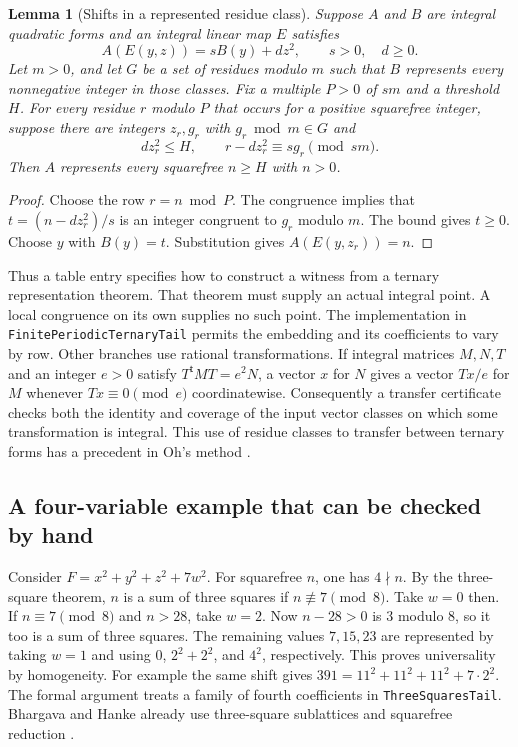 \documentclass[11pt,a4paper]{article}
\newtheorem{lemma}[theorem]{Lemma}
\newcommand{\code}[1]{\texttt{#1}}
\begin{document}
\begin{lemma}[Shifts in a represented residue class]\label{lem:shift}
Suppose $A$ and $B$ are integral quadratic forms and an integral linear
map $E$ satisfies
\[
 A(E(y,z))=s B(y)+d z^2,\qquad s>0,\quad d\geq0 .
\]
Let $m>0$, and let $G$ be a set of residues modulo $m$ such that $B$
represents every nonnegative integer in those classes. Fix a multiple
$P>0$ of $sm$ and a threshold $H$. For every residue $r$ modulo $P$
that occurs for a positive squarefree integer, suppose there are integers
$z_r,g_r$ with $g_r\bmod m\in G$ and
\[
 d z_r^2\leq H,\qquad
 r-d z_r^2\equiv s g_r \pmod{sm}.
\]
Then $A$ represents every squarefree $n\geq H$ with $n>0$.
\end{lemma}
\begin{proof}
Choose the row $r=n\bmod P$. The congruence implies that
$t=(n-dz_r^2)/s$ is an integer congruent to $g_r$ modulo $m$.
The bound gives $t\geq0$. Choose $y$ with $B(y)=t$.
Substitution gives $A(E(y,z_r))=n$.
\end{proof}

Thus a table entry specifies how to construct a witness from a ternary
representation theorem. That theorem must supply an actual integral
point. A local congruence on its own supplies no such point.
The implementation in \code{FinitePeriodicTernaryTail} permits the
embedding and its coefficients to vary by row. Other branches use
rational transformations. If integral matrices $M,N,T$ and an integer
$e>0$ satisfy $T^{\mathsf t}MT=e^2N$, a vector $x$ for $N$ gives a
vector $Tx/e$ for $M$ whenever $Tx\equiv0\pmod e$ coordinatewise.
Consequently a transfer certificate checks both the identity and
coverage of the input vector classes on which some transformation is
integral. This use of residue classes to transfer between ternary forms
has a precedent in Oh's method \cite[Lemma~2.2 and Theorem~2.3]{Oh}.

\subsection{A four-variable example that can be checked by hand}
Consider $F=x^2+y^2+z^2+7w^2$. For squarefree $n$, one has $4\nmid n$.
By the three-square theorem, $n$ is a sum of three squares if
$n\not\equiv7\pmod8$. Take $w=0$ then. If $n\equiv7\pmod8$ and $n>28$,
take $w=2$. Now $n-28>0$ is $3$ modulo $8$, so it too is a sum of
three squares. The remaining values $7,15,23$ are represented by taking
$w=1$ and using $0$, $2^2+2^2$, and $4^2$, respectively. This proves
universality by homogeneity. For example the same shift gives
$391=11^2+11^2+11^2+7\cdot2^2$. The formal argument treats a family
of fourth coefficients in \code{ThreeSquaresTail}. Bhargava and Hanke
already use three-square sublattices and squarefree reduction
\cite[\S4.1]{BH}.
\end{document}
